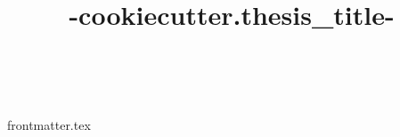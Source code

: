 \documentclass{book}
\title{ {{-cookiecutter.thesis_title-}} }
\author{\givenname\ \surname}
\begin{document}
{frontmatter.tex}
\end{document}

